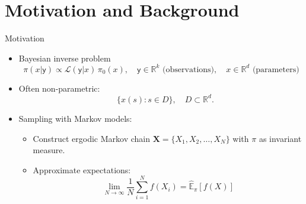 \documentclass[aspectratio=169, 10pt, compress]{beamer}
\begin{document}
\section{Motivation and Background}

\begin{frame}{Motivation}
\begin{itemize}[<+->]
    \item Bayesian inverse problem
    \begin{equation*}
        \pi(x|\mathsf{y}) \propto \mathcal{L}(\mathsf{y}|x)\, \pi_0(x), \quad \mathsf{y} \in \mathbb{R}^k \text{ (observations)}, \quad x \in \mathbb{R}^d \text{ (parameters)}
    \end{equation*}
    \item Often non-parametric: 
    \begin{equation*}
        \quad \{x(s): s\in D\}, \quad D \subset \mathbb{R}^d.
    \end{equation*}
    \vspace{0.25em}
    \item Sampling with Markov models:
    \begin{itemize}
        \item Construct ergodic Markov chain $\bm{X}=\{X_1, X_2, \dots, X_N\}$ with $\pi$ as invariant measure.
        \vspace{0.25em}
        \item Approximate expectations:
        \[
            \lim_{N \to \infty} \frac{1}{N} \sum_{i=1}^N f(X_i) =  \hat{\mathbb{E}}_{\pi}[f(X)]
        \]
    \end{itemize}
\end{itemize}
\end{frame}
\end{document}
